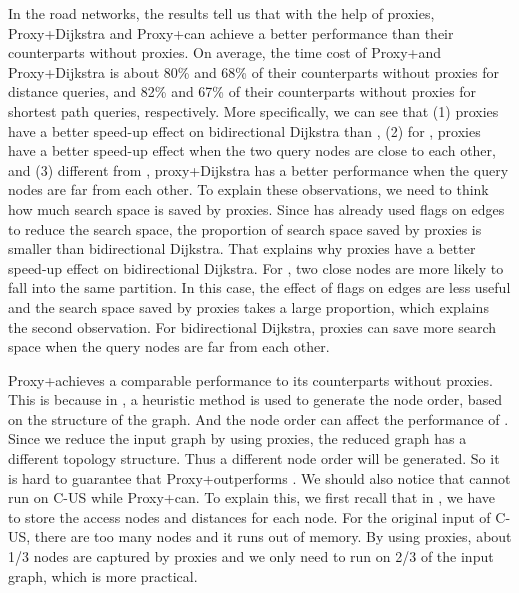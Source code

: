 In the road networks, the results tell us that with the help of proxies, Proxy+Dijkstra and Proxy+\arcflag can achieve a better performance than their counterparts without proxies. On average, the time cost of Proxy+\arcflag and Proxy+Dijkstra is about 80\% and 68\% of their counterparts without proxies for distance queries, and 82\% and 67\% of their counterparts without proxies for shortest path queries, respectively. More specifically, we can see that (1) proxies have a better speed-up effect on bidirectional Dijkstra than \arcflag, (2) for \arcflag, proxies have a better speed-up effect when the two query nodes are close to each other, and (3) different from \arcflag, proxy+Dijkstra has a better performance when the query nodes are far from each other. To explain these observations, we need to think how much search space is saved by proxies. Since \arcflag has already used flags on edges to reduce the search space, the proportion of search space saved by proxies is smaller than bidirectional Dijkstra. That explains why proxies have a better speed-up effect on bidirectional Dijkstra. For \arcflag, two close nodes are more likely to fall into the same partition. In this case, the effect of flags on edges are less useful and the search space saved by proxies takes a large proportion, which explains the second observation. For bidirectional Dijkstra, proxies can save more search space when the query nodes are far from each other.

Proxy+\tnr achieves a comparable performance to its counterparts without proxies. This is because in \tnr, a heuristic method is used to generate the node order, based on the structure of the graph. And the node order can affect the performance of \tnr. Since we reduce the input graph by using proxies, the reduced graph has a different topology structure. Thus a different node order will be generated. So it is hard to guarantee that Proxy+\tnr outperforms \tnr. We should also notice that \tnr cannot run on C-US while Proxy+\tnr can. To explain this, we first recall that in \tnr, we have to store the access nodes and distances for each node. For the original input of C-US, there are too many nodes and it runs out of memory. By using proxies, about 1/3 nodes are captured by proxies and we only need to run \tnr on 2/3 of the input graph, which is more practical.







